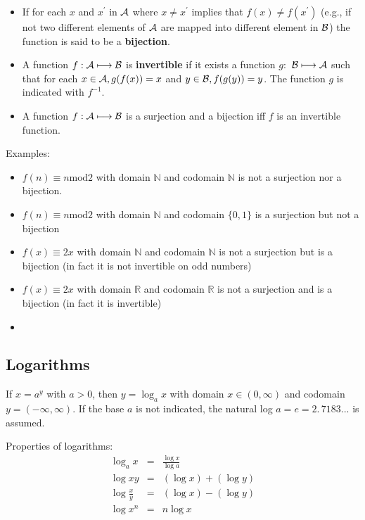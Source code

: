\documentclass[justified, sixbynine]{tufte-book}
\def\func{\textrm}
\theoremstyle{plain}%
\newtheorem * {corollary}{Corollary}
\theoremstyle{definition}
\theoremstyle{remark}
\newtheorem * {remark}{Remark}
\newtheorem * {note}{Note}
\begin{document}
\begin{fullwidth}
\begin{itemize}
\item  If for each $x$ and $x^{\prime }$ in ${\cal A}$ where $x\neq
x^{\prime }$ implies that $f(x)\neq f(x^{\prime })$ (e.g., if not two
different elements of ${\cal A}$ are mapped into different element in ${\cal B%
}$) the function is said to be a {\bf bijection}.

\item  A function $f:{\cal A}\longmapsto {\cal B}$ is {\bf invertible} if it
exists a function $g:$ ${\cal B}\longmapsto {\cal A}$ such that for each $%
x\in {\cal A}, g(f(x))=x$ and $y\in {\cal B}, f(g(y))=y$. The function $g$ is
indicated with $f^{-1}$.

\item  A function $f:{\cal A}\longmapsto {\cal B}$ is a surjection and a
bijection iff $f$ is an invertible function.
\end{itemize}

Examples:

\begin{itemize}
\item
$f(n)\equiv n\func{mod}2$ with domain $\mathbb{N}$ and codomain $%
\mathbb{N}$ is not a surjection nor a bijection.
\item
$f(n)\equiv n\func{mod}2$ with domain $\mathbb{N}$ and codomain $%
\{0, 1\}$ is a surjection but not a bijection
\item
$f(x)\equiv 2x$ with domain $\mathbb{N}$ and codomain $\mathbb{N}$ is
not a surjection but is a bijection (in fact it is not invertible on odd
numbers)
\item
$f(x)\equiv 2x$ with domain $\mathbb{R}$ and codomain $\mathbb{R}$ is
not a surjection and is a bijection (in fact it is invertible)
\item
\end{itemize}

\goodbreak\subsection{Logarithms}

If $x=a^y$ with $a>0$, then $y=\log _ax$ with domain $x\in (0, \infty )$ and
codomain $y=(-\infty , \infty )$. If the base $a$ is not indicated, the
natural log $a=e=\allowbreak 2.\, 7183...$ is assumed.

Properties of logarithms:
\begin{eqnarray}
\log _ax &=&\frac{\log x}{\log a} \\
\log xy &=&(\log x)+(\log y) \\
\log \frac xy &=&(\log x)-(\log y) \\
\log x^n &=&n\log x
\end{eqnarray}


\end{fullwidth}
\end{document}

